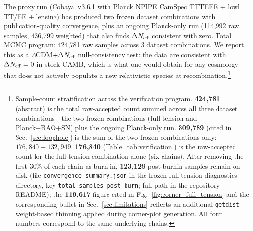 \documentclass[aps,prd,twocolumn,superscriptaddress,showpacs,preprintnumbers,nofootinbib,longbibliography,floatfix]{revtex4-2}
\newcommand{\Neff}{N_{\rm eff}}
\begin{document}
The proxy run (Cobaya~v3.6.1 with Planck NPIPE CamSpec TTTEEE + lowl TT/EE + lensing) has produced two frozen dataset combinations with publication-quality convergence, plus an ongoing Planck-only run (114{,}992 raw samples, 436{,}799 weighted) that also finds $\Delta\Neff$ consistent with zero. Total MCMC program: 424{,}781 raw samples across 3 dataset combinations. We report this as a $\Lambda$CDM$+\Delta\Neff$ null-consistency test: the data are consistent with $\Delta\Neff = 0$ in stock CAMB, which is what one would obtain for any cosmology that does not actively populate a new relativistic species at recombination.\footnote{\label{fn:sample_stratification}Sample-count stratification across the verification program. \textbf{424{,}781} (abstract) is the total raw-accepted count summed across all three dataset combinations---the two frozen combinations (full-tension and Planck+BAO+SN) plus the ongoing Planck-only run. \textbf{309{,}789} (cited in Sec.~\ref{sec:loophole}) is the sum of the two frozen combinations only: $176{,}840 + 132{,}949$. \textbf{176{,}840} (Table~\ref{tab:verification}) is the raw-accepted count for the full-tension combination alone (six chains). After removing the first 30\% of each chain as burn-in, \textbf{123{,}129} post-burnin samples remain on disk (file \texttt{convergence\_summary.json} in the frozen full-tension diagnostics directory, key \texttt{total\_samples\_post\_burn}; full path in the repository README); the \textbf{119{,}617} figure cited in Fig.~\ref{fig:corner_full_tension} and the corresponding bullet in Sec.~\ref{sec:limitations} reflects an additional \texttt{getdist} weight-based thinning applied during corner-plot generation. All four numbers correspond to the same underlying chains.}
\end{document}
